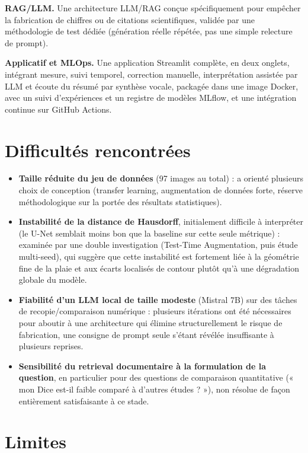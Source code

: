 \documentclass[12pt,a4paper]{report}
\begin{document}
\textbf{RAG/LLM.} Une architecture LLM/RAG conçue spécifiquement pour empêcher la fabrication de chiffres ou de citations scientifiques, validée par une méthodologie de test dédiée (génération réelle répétée, pas une simple relecture de prompt).

\textbf{Applicatif et MLOps.} Une application Streamlit complète, en deux onglets, intégrant mesure, suivi temporel, correction manuelle, interprétation assistée par LLM et écoute du résumé par synthèse vocale, packagée dans une image Docker, avec un suivi d'expériences et un registre de modèles MLflow, et une intégration continue sur GitHub Actions.

\section{Difficultés rencontrées}

\begin{itemize}
\item \textbf{Taille réduite du jeu de données} (97 images au total) : a orienté plusieurs choix de conception (transfer learning, augmentation de données forte, réserve méthodologique sur la portée des résultats statistiques).
\item \textbf{Instabilité de la distance de Hausdorff}, initialement difficile à interpréter (le U-Net semblait moins bon que la baseline sur cette seule métrique) : examinée par une double investigation (Test-Time Augmentation, puis étude multi-seed), qui suggère que cette instabilité est fortement liée à la géométrie fine de la plaie et aux écarts localisés de contour plutôt qu'à une dégradation globale du modèle.
\item \textbf{Fiabilité d'un LLM local de taille modeste} (Mistral 7B) sur des tâches de recopie/comparaison numérique : plusieurs itérations ont été nécessaires pour aboutir à une architecture qui élimine structurellement le risque de fabrication, une consigne de prompt seule s'étant révélée insuffisante à plusieurs reprises.
\item \textbf{Sensibilité du retrieval documentaire à la formulation de la question}, en particulier pour des questions de comparaison quantitative (« mon Dice est-il faible comparé à d'autres études ? »), non résolue de façon entièrement satisfaisante à ce stade.
\end{itemize}

\section{Limites}
\end{document}
